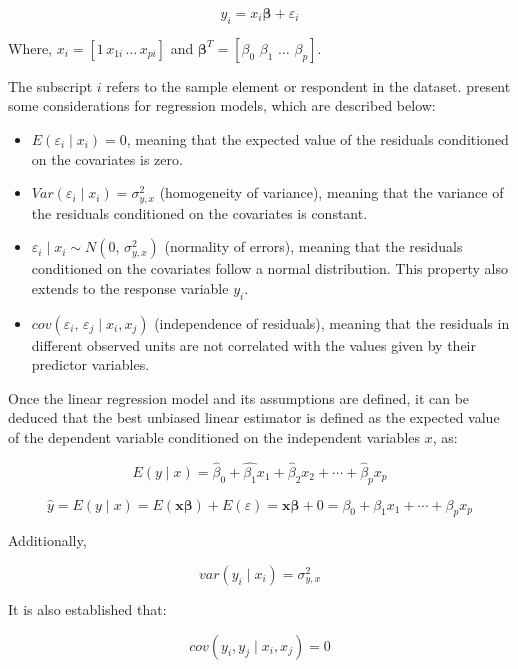 \documentclass[
  12pt,
]{book}
\providecommand{\tightlist}{%
  \setlength{\itemsep}{0pt}\setlength{\parskip}{0pt}}
\begin{document}
\[
y_{i}  =  x_{i}\boldsymbol{\beta}+\varepsilon_{i}
\]

Where, \(x_{i}=\left[1\,x_{1i}\,\ldots\,x_{pi}\right]\) and \(\boldsymbol{\beta}^{T}=\left[\beta_{0}\,\,\beta_{1}\,\,\ldots\,\,\beta_{p}\right]\).

The subscript \(i\) refers to the sample element or respondent in the dataset. \citet{Heeringa_West_Berglund_2017} present some considerations for regression models, which are described below:

\begin{itemize}
\tightlist
\item
  \(E\left(\varepsilon_{i}\mid x_{i}\right)=0\), meaning that the expected value of the residuals conditioned on the covariates is zero.
\item
  \(Var\left(\varepsilon_{i}\mid x_{i}\right)=\sigma_{y,x}^{2}\) (homogeneity of variance), meaning that the variance of the residuals conditioned on the covariates is constant.
\item
  \(\varepsilon_{i}\mid x_{i}\sim N\left(0,\,\sigma_{y,x}^{2}\right)\) (normality of errors), meaning that the residuals conditioned on the covariates follow a normal distribution. This property also extends to the response variable \(y_{i}\).
\item
  \(cov\left(\varepsilon_{i},\,\varepsilon_{j}\mid x_{i},x_{j}\right)\) (independence of residuals), meaning that the residuals in different observed units are not correlated with the values given by their predictor variables.
\end{itemize}

Once the linear regression model and its assumptions are defined, it can be deduced that the best unbiased linear estimator is defined as the expected value of the dependent variable conditioned on the independent variables \(x\), as:

\[
E\left(y\mid x\right)=\hat{\beta}_{0}+\hat{\beta_{1}}x_{1}+\hat{\beta}_{2}x_{2}+\cdots+\hat{\beta}_{p}x_{p}
\]

\[
\hat{y}  =  E\left(y\mid x\right)
 =  E\left(\boldsymbol{x}\boldsymbol{\beta}\right)+E\left(\varepsilon\right)
=  \boldsymbol{x}\boldsymbol{\beta}+0
  =  \beta_{0}+\beta_{1}x_{1}+\cdots+\beta_{p}x_{p}
\]

Additionally,

\[
var\left(y_{i}\mid x_{i}\right)  =  \sigma_{y,x}^{2}
\]

It is also established that:

\[
cov\left(y_{i},y_{j}\mid x_{i},x_{j}\right)  = 0
\]
\end{document}
